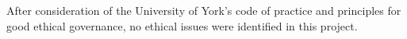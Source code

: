 After consideration of the University of York's code of practice and principles for good ethical governance, no ethical issues were identified in this project.